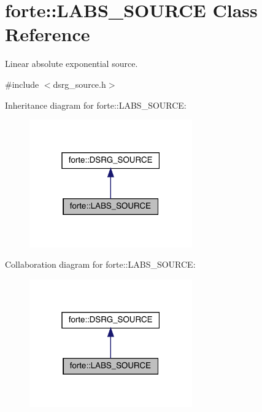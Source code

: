 \hypertarget{classforte_1_1_l_a_b_s___s_o_u_r_c_e}{}\section{forte\+:\+:L\+A\+B\+S\+\_\+\+S\+O\+U\+R\+CE Class Reference}
\label{classforte_1_1_l_a_b_s___s_o_u_r_c_e}


Linear absolute exponential source.  




{\ttfamily \#include $<$dsrg\+\_\+source.\+h$>$}



Inheritance diagram for forte\+:\+:L\+A\+B\+S\+\_\+\+S\+O\+U\+R\+CE\+:
\nopagebreak
\begin{figure}[H]
\begin{center}
\leavevmode
\includegraphics[width=199pt]{classforte_1_1_l_a_b_s___s_o_u_r_c_e__inherit__graph}
\end{center}
\end{figure}


Collaboration diagram for forte\+:\+:L\+A\+B\+S\+\_\+\+S\+O\+U\+R\+CE\+:
\nopagebreak
\begin{figure}[H]
\begin{center}
\leavevmode
\includegraphics[width=199pt]{classforte_1_1_l_a_b_s___s_o_u_r_c_e__coll__graph}
\end{center}
\end{figure}
